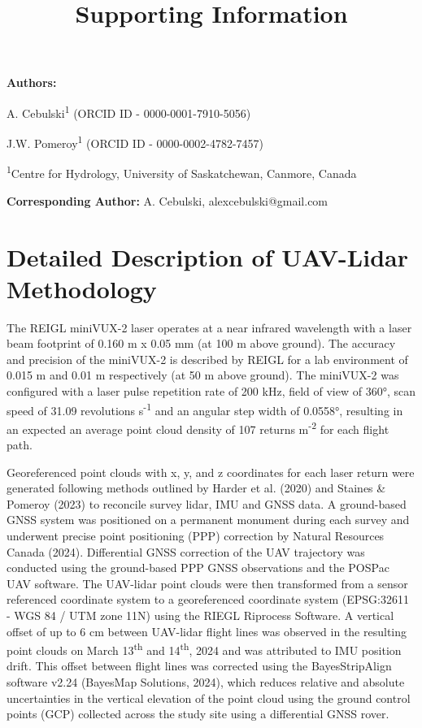 \documentclass[
  letterpaper,
  DIV=11,
  numbers=noendperiod]{scrartcl}
\title{Supporting Information}
\author{}
\date{}
\begin{document}
\maketitle


\textbf{Authors:}

A. Cebulski\textsuperscript{1} (ORCID ID - 0000-0001-7910-5056)

J.W. Pomeroy\textsuperscript{1} (ORCID ID - 0000-0002-4782-7457)

\textsuperscript{1}Centre for Hydrology, University of Saskatchewan,
Canmore, Canada

\textbf{Corresponding Author:} A. Cebulski, alexcebulski@gmail.com

\section{Detailed Description of UAV-Lidar
Methodology}\label{detailed-description-of-uav-lidar-methodology}

The REIGL miniVUX-2 laser operates at a near infrared wavelength with a
laser beam footprint of 0.160 m x 0.05 mm (at 100 m above ground). The
accuracy and precision of the miniVUX-2 is described by REIGL for a lab
environment of 0.015 m and 0.01 m respectively (at 50 m above ground).
The miniVUX-2 was configured with a laser pulse repetition rate of 200
kHz, field of view of 360°, scan speed of 31.09 revolutions
s\textsuperscript{-1} and an angular step width of 0.0558°, resulting in
an expected an average point cloud density of 107 returns
m\textsuperscript{-2} for each flight path.

Georeferenced point clouds with x, y, and z coordinates for each laser
return were generated following methods outlined by Harder et al. (2020)
and Staines \& Pomeroy (2023) to reconcile survey lidar, IMU and GNSS
data. A ground-based GNSS system was positioned on a permanent monument
during each survey and underwent precise point positioning (PPP)
correction by Natural Resources Canada (2024). Differential GNSS
correction of the UAV trajectory was conducted using the ground-based
PPP GNSS observations and the POSPac UAV software. The UAV-lidar point
clouds were then transformed from a sensor referenced coordinate system
to a georeferenced coordinate system (EPSG:32611 - WGS 84 / UTM zone
11N) using the RIEGL Riprocess Software. A vertical offset of up to 6 cm
between UAV-lidar flight lines was observed in the resulting point
clouds on March 13\textsuperscript{th} and 14\textsuperscript{th}, 2024
and was attributed to IMU position drift. This offset between flight
lines was corrected using the BayesStripAlign software v2.24 (BayesMap
Solutions, 2024), which reduces relative and absolute uncertainties in
the vertical elevation of the point cloud using the ground control
points (GCP) collected across the study site using a differential GNSS
rover.
\end{document}
